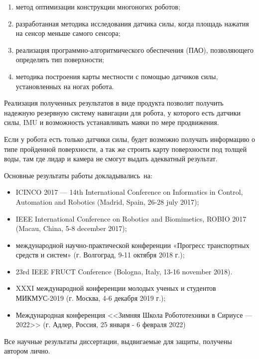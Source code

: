 {}
\begin{enumerate}[beginpenalty=10000] %
  \item метод оптимизации конструкции многоногих роботов;
  \item разработанная методика исследования датчика силы, когда площадь нажатия на сенсор меньше самого сенсора;
  \item реализация программно-алгоритмического обеспечения (ПАО), позволяющего определять тип поверхности;
  \item методика построения карты местности с помощью датчиков силы, установленных на ногах робота.
\end{enumerate}


{\influence} Реализация полученных результатов в виде продукта позволит получить надежную резервную систему навигации для робота, у которого есть датчики силы, IMU и возможность устанавливать маяки по мере продвижения.

Если у робота есть только датчики силы, будет возможно получать информацию о типе пройденной поверхности, а так же строить карту поверхности под толщей воды, там где лидар и камера не смогут выдать адекватный результат.


{\probation}
Основные результаты работы докладывались~на:
\begin{itemize}
  \item ICINCO 2017 --- 14th International Conference on Informatics in Control, Automation and Robotics (Madrid, Spain, 26-28 july 2017);
  \item IEEE International Conference on Robotics and Biomimetics, ROBIO 2017 (Macau, China, 5-8 december 2017);
  \item  международной  научно-практической  конференции  «Прогресс  транспортных 
  средств и систем» (г. Волгоград, 9-11 октября 2018 г.);
  \item 23rd IEEE FRUCT Conference (Bologna, Italy, 13-16 november 2018).
  \item XXXI международной конференции молодых ученых и студентов МИКМУС-2019 
  (г. Москва, 4-6 декабря 2019 г.);
  \item Международная конференция <<Зимняя Школа Робототехники в Сириусе --- 2022>> (г. Адлер, Россия, 25 января - 6 февраля 2022)
\end{itemize}

{\contribution} Все научные результаты диссертации, выдвигаемые для защиты, получены автором лично.

